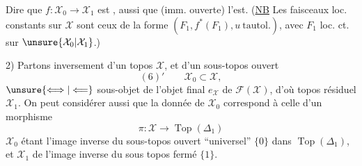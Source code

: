 Dire que $f:\mathcal X_0\longrightarrow\mathcal X_1$ est ,  aussi que
(imm. ouverte) l'est. (\uline{NB} Les faisceaux loc. constants sur $\mathcal X$ sont ceux de la forme $(F_1,f^*(F_1),u\ \text{tautol.})$, avec $F_1$ loc. ct. sur $\unsure{\mathcal X_0|\mathcal X_1}$.)

2) Partons inversement d'un topos $\mathcal X$, et d'un sous-topos ouvert
\[
(6)'\qquad\mathcal X_0\subset\mathcal X,
\]
$\unsure{\Longleftrightarrow|\Longleftarrow}$ sous-objet de l'objet final $e_{\mathcal X}$ de $\mathcal F(\mathcal X)$, d'où topos résiduel $\mathcal X_1$. On peut considérer aussi que la donnée de $\mathcal X_0$ correspond à celle d'un morphisme
\[
\pi:\mathcal X\longrightarrow\operatorname{Top}(\Delta_1)
\]
$\mathcal X_0$ étant l'image inverse du sous-topos ouvert ``universel'' $\{0\}$ dans $\operatorname{Top}(\Delta_1)$, et $\mathcal X_1$ de  l'image inverse du sous topos fermé $\{1\}$.
